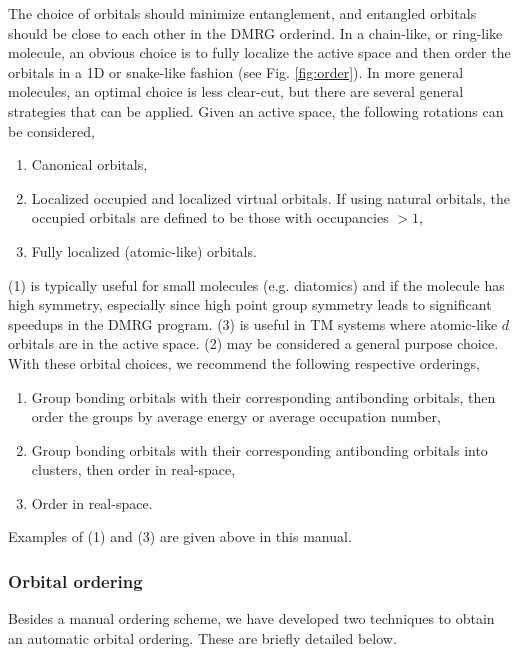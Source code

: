 \documentclass[letterpaper,12pt,aps, pra]{revtex4-1}
\begin{document}
The choice of orbitals should
minimize entanglement, and entangled orbitals should be close to each other in the DMRG orderind.
In a chain-like, or ring-like molecule, an obvious choice is to fully localize the active space and then order the orbitals in a 1D or snake-like fashion (see Fig. \ref{fig:order}). In
more general molecules, an optimal choice is less clear-cut, but there are several general strategies that can be applied. Given an active space, the following rotations can be considered,
\begin{enumerate}
\item Canonical orbitals,
\item Localized occupied and localized virtual orbitals. If using natural orbitals, the occupied orbitals are defined to be those with occupancies $>1$,
\item Fully localized (atomic-like) orbitals.
\end{enumerate}
(1) is typically useful for small molecules (e.g. diatomics) and if the molecule has high symmetry, especially since high point group symmetry leads to significant speedups in the DMRG program.
(3) is useful in TM systems where atomic-like $d$ orbitals are in the active space. (2) may be considered a general purpose choice. With these orbital choices,
we recommend the following respective orderings,
\begin{enumerate}
\item Group bonding orbitals with their corresponding antibonding orbitals, then order the groups by average energy or average occupation number,
\item Group bonding orbitals with their corresponding antibonding orbitals into clusters, then order in real-space,
\item Order in real-space.
\end{enumerate}

Examples of (1) and (3) are given above in this manual. 

\subsubsection{Orbital ordering}

Besides a manual ordering scheme,  we have developed two techniques to obtain
an automatic orbital ordering. These are briefly detailed below. 
\end{document}

